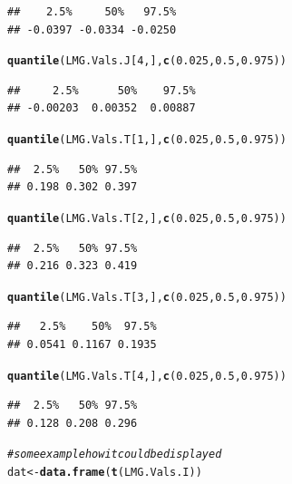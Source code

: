 \documentclass[11pt,a4paper,twoside]{book}
\makeatletter
\newcommand{\hlnum}[1]{\textcolor[rgb]{0.686,0.059,0.569}{#1}}%
\newcommand{\hlcom}[1]{\textcolor[rgb]{0.678,0.584,0.686}{\textit{#1}}}%
\newcommand{\hlstd}[1]{\textcolor[rgb]{0.345,0.345,0.345}{#1}}%
\newcommand{\hlkwb}[1]{\textcolor[rgb]{0.69,0.353,0.396}{#1}}%
\newcommand{\hlkwd}[1]{\textcolor[rgb]{0.737,0.353,0.396}{\textbf{#1}}}%
\newenvironment{kframe}{%
 \def\at@end@of@kframe{}%
 \ifinner\ifhmode%
  \def\at@end@of@kframe{\end{minipage}}%
  \begin{minipage}{\columnwidth}%
 \fi\fi%
 \def\FrameCommand##1{\hskip\@totalleftmargin \hskip-\fboxsep
 \colorbox{shadecolor}{##1}\hskip-\fboxsep
     \hskip-\linewidth \hskip-\@totalleftmargin \hskip\columnwidth}%
 \MakeFramed {\advance\hsize-\width
   \@totalleftmargin\z@ \linewidth\hsize
   \@setminipage}}%
 {\par\unskip\endMakeFramed%
 \at@end@of@kframe}
\newenvironment{knitrout}{}{} %
\makeatother
\begin{document}
\begin{knitrout}
\begin{kframe}
\begin{alltt}
\end{alltt}
\begin{verbatim}
##    2.5%     50%   97.5% 
## -0.0397 -0.0334 -0.0250
\end{verbatim}
\begin{alltt}
\hlkwd{quantile}\hlstd{(LMG.Vals.J[}\hlnum{4}\hlstd{,],} \hlkwd{c}\hlstd{(}\hlnum{0.025}\hlstd{,} \hlnum{0.5}\hlstd{,} \hlnum{0.975}\hlstd{))}
\end{alltt}
\begin{verbatim}
##     2.5%      50%    97.5% 
## -0.00203  0.00352  0.00887
\end{verbatim}
\begin{alltt}
\hlkwd{quantile}\hlstd{(LMG.Vals.T[}\hlnum{1}\hlstd{,],} \hlkwd{c}\hlstd{(}\hlnum{0.025}\hlstd{,} \hlnum{0.5}\hlstd{,} \hlnum{0.975}\hlstd{))}
\end{alltt}
\begin{verbatim}
##  2.5%   50% 97.5% 
## 0.198 0.302 0.397
\end{verbatim}
\begin{alltt}
\hlkwd{quantile}\hlstd{(LMG.Vals.T[}\hlnum{2}\hlstd{,],} \hlkwd{c}\hlstd{(}\hlnum{0.025}\hlstd{,} \hlnum{0.5}\hlstd{,} \hlnum{0.975}\hlstd{))}
\end{alltt}
\begin{verbatim}
##  2.5%   50% 97.5% 
## 0.216 0.323 0.419
\end{verbatim}
\begin{alltt}
\hlkwd{quantile}\hlstd{(LMG.Vals.T[}\hlnum{3}\hlstd{,],} \hlkwd{c}\hlstd{(}\hlnum{0.025}\hlstd{,} \hlnum{0.5}\hlstd{,} \hlnum{0.975}\hlstd{))}
\end{alltt}
\begin{verbatim}
##   2.5%    50%  97.5% 
## 0.0541 0.1167 0.1935
\end{verbatim}
\begin{alltt}
\hlkwd{quantile}\hlstd{(LMG.Vals.T[}\hlnum{4}\hlstd{,],} \hlkwd{c}\hlstd{(}\hlnum{0.025}\hlstd{,} \hlnum{0.5}\hlstd{,} \hlnum{0.975}\hlstd{))}
\end{alltt}
\begin{verbatim}
##  2.5%   50% 97.5% 
## 0.128 0.208 0.296
\end{verbatim}
\begin{alltt}
\hlcom{# some example how it could be displayed}
\hlstd{dat} \hlkwb{<-} \hlkwd{data.frame}\hlstd{(}\hlkwd{t}\hlstd{(LMG.Vals.I))}


\end{alltt}
\end{kframe}
\end{knitrout}
\end{document}
